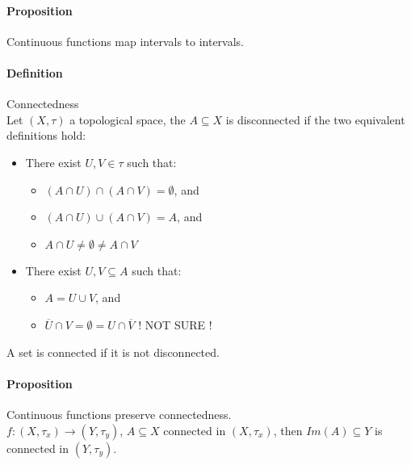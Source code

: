 \documentclass{article}
\newcommand{\func}[3]{#1 : #2 \rightarrow #3}
\newcommand{\Def}{\paragraph{Definition}}
\newcommand{\Proposition}{\paragraph{Proposition}}
\newcommand{\Proof}{\paragraph{Proof}}
\begin{document}
  \Proposition Continuous functions map intervals to intervals.


  \Def Connectedness
\\Let $(X, \tau)$ a topological space, the $A \subseteq X$ is disconnected if
  the two equivalent definitions hold:
  \begin{itemize}
    \item There exist $U, V \in \tau$ such that:
    \begin{itemize}
      \item $(A \cap U) \cap (A \cap V) = \emptyset$, and
      \item $(A \cap U) \cup (A \cap V) = A$, and
      \item $A \cap U \neq \emptyset \neq A \cap V$
    \end{itemize}

    \item There exist $U, V \subseteq A$ such that:
    \begin{itemize}
      \item $A = U \cup V$, and
      \item $\overline{U} \cap V = \emptyset = U \cap \overline{V}$ ! NOT SURE !
    \end{itemize}
  \end{itemize}
  A set is connected if it is not disconnected.

  \Proposition Continuous functions preserve connectedness.
\\$\func{f}{(X,\tau_x)}{(Y,\tau_y)}$, $A \subseteq X$ connected in $(X,\tau_x)$,
  then $Im(A) \subseteq Y$ is connected in $(Y,\tau_y)$.
\end{document}
